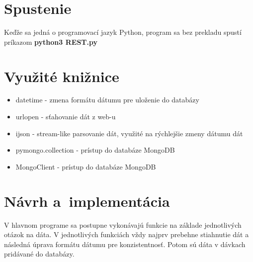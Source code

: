 \documentclass[a4paper, 11pt]{article}
\begin{document}
    \section{Spustenie}
    Keďže sa jedná o programovací jazyk Python, program sa bez prekladu spustí príkazom \textbf{python3 REST.py} 
    
    \section{Využité knižnice}
    \begin{itemize}
        \item datetime - zmena formátu dátumu pre uloženie do databázy
        \item urlopen - sťahovanie dát z web-u
        \item ijson - stream-like parsovanie dát, využité na rýchlejšie zmeny dátumu dát
        \item pymongo.collection - prístup do databáze MongoDB
        \item MongoClient - prístup do databáze MongoDB
    \end{itemize}


	\section{Návrh a~implementácia}
    
    V hlavnom programe sa postupne vykonávajú funkcie na základe jednotlivých otázok na dáta. V jednotlivých funkciách vždy najprv prebehne stiahnutie dát a následná úprava formátu dátumu pre konzistentnosť. Potom sú dáta v dávkach pridávané do databázy. 
    
	 
\end{document}

